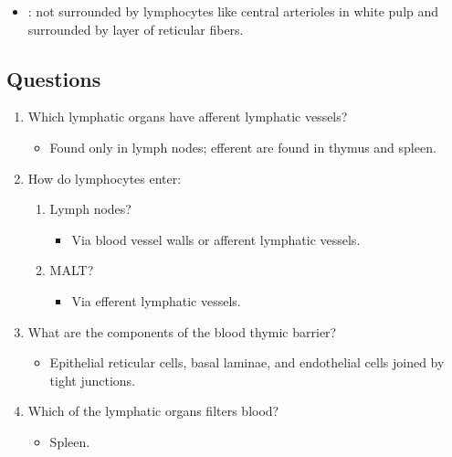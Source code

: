 \begin{itemize}
\begin{multicols}{2}
\begin{itemize}
    \begin{center}
    \end{center}
    
    \item {}: not surrounded by lymphocytes like central arterioles in white pulp and surrounded by layer of reticular fibers.
    
    \begin{center}
    \end{center}
    
    
  \end{itemize}
  \end{multicols}

  \subsection{Questions}\label{Questions}
  \begin{enumerate}\color{minor}
    \item Which lymphatic organs have afferent lymphatic vessels?
      \begin{itemize}\color{text}
        \item Found only in lymph nodes; efferent are found in thymus and spleen.
      \end{itemize}
    \item How do lymphocytes enter:
      \begin{enumerate}
        \item Lymph nodes?
          \begin{itemize}\color{text}
            \item Via blood vessel walls or afferent lymphatic vessels.
          \end{itemize}
        \item MALT\@?
          \begin{itemize}\color{text}
            \item Via efferent lymphatic vessels.
          \end{itemize}
      \end{enumerate}
    \item What are the components of the blood thymic barrier?
    \begin{itemize}\color{text}
      \item Epithelial reticular cells, basal laminae, and endothelial cells joined by tight junctions.
    \end{itemize}
    \item Which of the lymphatic organs filters blood?
      \begin{itemize}\color{text}
        \item Spleen.
      \end{itemize}
  \end{enumerate}
  
\end{itemize}

